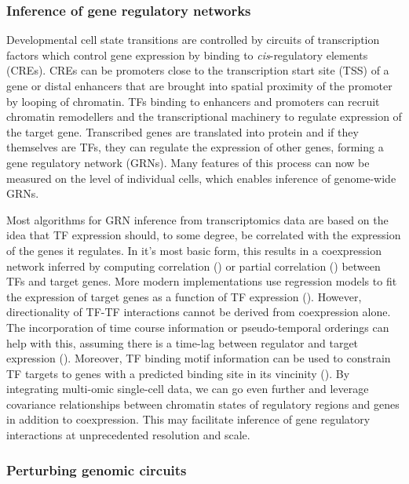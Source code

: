\subsubsection{Inference of gene regulatory networks}

Developmental cell state transitions are controlled by circuits of transcription factors which control gene expression by binding to \textit{cis}-regulatory elements (CREs). CREs can be promoters close to the transcription start site (TSS) of a gene or distal enhancers that are brought into spatial proximity of the promoter by looping of chromatin. TFs binding to enhancers and promoters can recruit chromatin remodellers and the transcriptional machinery to regulate expression of the target gene. Transcribed genes are translated into protein and if they themselves are TFs, they can regulate the expression of other genes, forming a gene regulatory network (GRNs). Many features of this process can now be measured on the level of individual cells, which enables inference of genome-wide GRNs.

Most algorithms for GRN inference from transcriptomics data are based on the idea that TF expression should, to some degree, be correlated with the expression of the genes it regulates. In it's most basic form, this results in a coexpression network inferred by computing correlation (\cite{stuart_gene-coexpression_2003}) or partial correlation (\cite{kim_ppcor_2015}) between TFs and target genes. More modern implementations use regression models to fit the expression of target genes as a function of TF expression (\cite{aibar_scenic_2017}). However, directionality of TF-TF interactions cannot be derived from coexpression alone. The incorporation of time course information or pseudo-temporal orderings can help with this, assuming there is a time-lag between regulator and target expression (\cite{qiu_inferring_2020}). Moreover, TF binding motif information can be used to constrain TF targets to genes with a predicted binding site in its vincinity (\cite{aibar_scenic_2017}). By integrating multi-omic single-cell data, we can go even further and leverage covariance relationships between chromatin states of regulatory regions and genes in addition to coexpression. This may facilitate inference of gene regulatory interactions at unprecedented resolution and scale.


\subsubsection{Perturbing genomic circuits}

